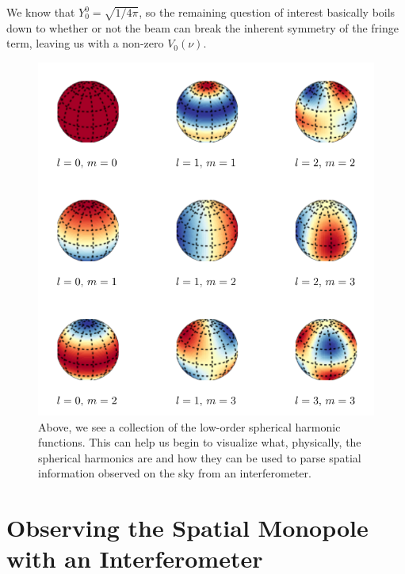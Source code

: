 We know that $Y_0^0 = \sqrt{1/4\pi}$, so the remaining question of interest 
basically boils down to whether or not the beam can break the inherent symmetry 
of the fringe term, leaving us with a non-zero $V_0(\nu)$.


\begin{figure}
    \begin{center}
    \includegraphics[width=\linewidth]{spherical_harmonics}
    \end{center}
    \caption{
         Above, we see a collection of the low-order spherical harmonic 
         functions. This can help us begin to visualize what, physically, the 
         spherical harmonics are and how they can be used to parse spatial 
         information observed on the sky from an interferometer.
    }
    \label{fig:spherical-harmonics}
\end{figure}

\section{Observing the Spatial Monopole with an Interferometer}
\label{sec:observing-monopole}

